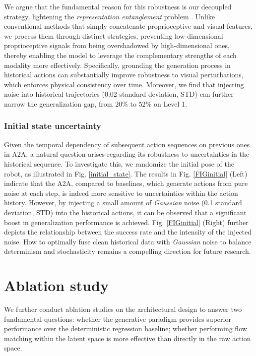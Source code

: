 \documentclass[onecolumn]{fairmeta}
\newcommand{\m}[1]{{A2A}}
\begin{document}
	We argue that the fundamental reason for this robustness is our decoupled strategy, lightening the \textit{representation entanglement} problem \citep{li2026causal}. Unlike conventional methods that simply concatenate proprioceptive and visual features, we process them through distinct strategies, preventing low-dimensional proprioceptive signals from being overshadowed by high-dimensional ones, thereby enabling the model to leverage the complementary strengths of each modality more effectively. Specifically, grounding the generation process in historical actions can substantially improve robustness to visual perturbations, which enforces physical consistency over time. Moreover, we find that injecting noise into historical trajectories (0.02 standard deviation, STD) can further narrow the generalization gap, from $20\%$ to $52\%$ on Level 1.
	
	\subsubsection{Initial state uncertainty} \label{sec-initial_state}
	
	Given the temporal dependency of subsequent action sequences on previous ones in \m{}, a natural question arises regarding its robustness to uncertainties in the historical sequence. To investigate this, we randomize the initial pose of the robot, as illustrated in Fig. \ref{initial_state}. The results in Fig. \ref{FIGinitial} (Left) indicate that the \m{}, compared to baselines, which generate actions from pure noise at each step, is indeed more sensitive to uncertainties within the action history. However, by injecting a small amount of \textit{Gaussian} noise (0.1 standard deviation, {STD}) into the historical actions, it can be observed that a significant boost in generalization performance is achieved. Fig. \ref{FIGinitial} (Right) further depicts the relationship between the success rate and the intensity of the injected noise. How to optimally fuse clean historical data with \textit{Gaussian} noise to balance determinism and stochasticity remains a compelling direction for future research.
	
	\section{Ablation study}
	We further conduct ablation studies on the architectural design to answer two fundamental questions: whether the generative paradigm provides superior performance over the deterministic regression baseline; whether performing flow matching within the latent space is more effective than directly in the raw action space.
	
\end{document}
